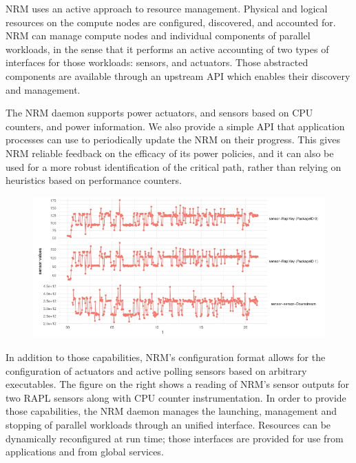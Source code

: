 
NRM uses an active approach to resource management. Physical and logical
resources on the compute nodes are configured, discovered, and accounted for.
NRM can manage compute nodes and individual components of parallel workloads,
in the sense that it performs an active accounting of two types of interfaces
for those workloads: sensors, and actuators. Those abstracted components are
available through an upstream API which enables their discovery and management.

The NRM daemon supports power actuators, and sensors based on CPU counters,
and power information. We also provide a simple API that application processes
can use to periodically update the NRM on their progress. This gives NRM
reliable feedback on the efficacy of its power policies, and it can also
be used for a more robust identification of the critical path, rather than
relying on heuristics based on performance counters.

\begin{figure}
  \includegraphics[width=.58\textwidth]{projects/2.3.1-PMR/2.3.1.19-Argo-PowerSteering/sensors}
\end{figure}
In addition to those capabilities, NRM's configuration format allows for
the configuration of actuators and active polling sensors based on arbitrary
executables. The figure on the right shows a reading of NRM's sensor
outputs for two RAPL sensors along with CPU counter instrumentation. In order
to provide those capabilities, the NRM daemon manages the launching, management
and stopping of parallel workloads through an unified interface. Resources
can be dynamically reconfigured at run time; those interfaces are provided
for use from applications and from global services.

